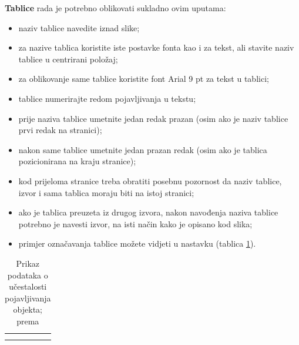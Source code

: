 \documentclass[]{foi} %
\begin{document}
\textbf{Tablice} rada je potrebno oblikovati sukladno ovim uputama:
\begin{itemize}
	\item naziv tablice navedite iznad slike;

	\item za nazive tablica koristite iste postavke fonta kao i za tekst, ali stavite naziv tablice u centrirani položaj;

	\item za oblikovanje same tablice koristite font Arial 9 pt za tekst u tablici;

	\item tablice numerirajte redom pojavljivanja u tekstu;

	\item prije naziva tablice umetnite jedan redak prazan (osim ako je naziv tablice prvi redak na stranici);

	\item nakon same tablice umetnite jedan prazan redak (osim ako je tablica pozicionirana na kraju stranice);

	\item kod prijeloma stranice treba obratiti posebnu pozornost da naziv tablice, izvor i sama tablica moraju biti na istoj stranici;

	\item ako je tablica preuzeta iz drugog izvora, nakon navođenja naziva tablice potrebno je navesti izvor, na isti način kako je opisano kod slika;

	\item primjer označavanja tablice možete vidjeti u nastavku (tablica \ref{tab:objekti}).
\end{itemize}

\begin{table}[h!]
	\centering
	\caption{Prikaz podataka o učestalosti pojavljivanja objekta; prema \cite{wooldridge2009IntroductionMultiAgentSystems}}
	\begin{tabularx}{0.66\textwidth}{|X|X|X|X|}
		\hline
		\cellcolor{gray!25} & \cellcolor{gray!25} & \cellcolor{gray!25} & \cellcolor{gray!25} \\
		\hline
		                    &                     &                     &                     \\
		\hline
		                    &                     &                     &                     \\
		\hline
	\end{tabularx}
	\\[10pt]
	\label{tab:objekti}
\end{table}
\end{document}
